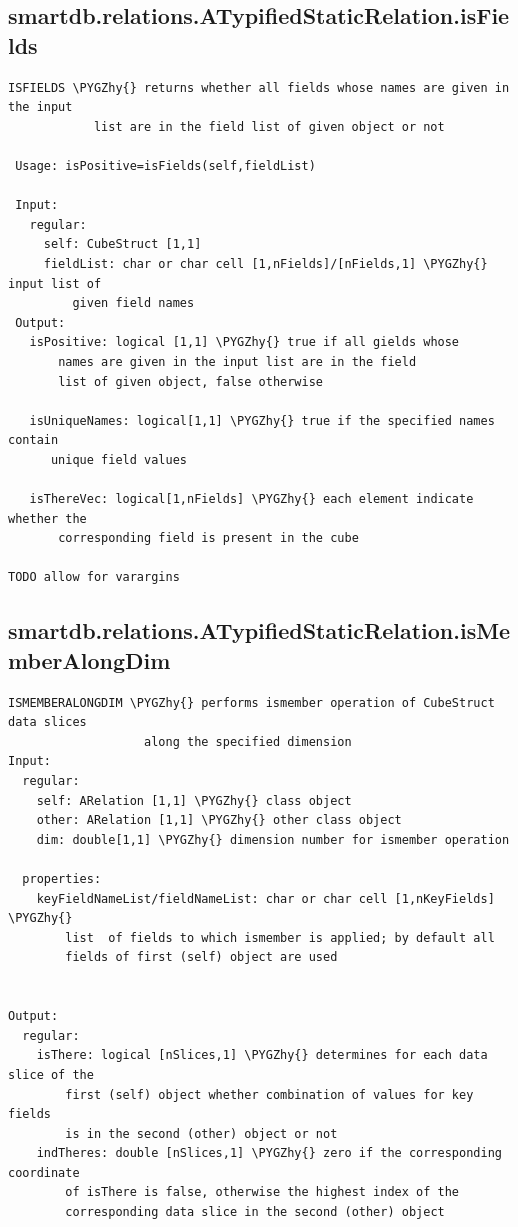 \documentclass[letterpaper,10pt,english]{sphinxmanual}
\def\PYGZhy{\char`\-}
\begin{document}
\subsection{smartdb.relations.ATypifiedStaticRelation.isFields}
\label{chap_functions:smartdb-relations-atypifiedstaticrelation-isfields}
\begin{Verbatim}[commandchars=\\\{\}]
 ISFIELDS \PYGZhy{} returns whether all fields whose names are given in the input
            list are in the field list of given object or not

 Usage: isPositive=isFields(self,fieldList)

 Input:
   regular:
     self: CubeStruct [1,1]
     fieldList: char or char cell [1,nFields]/[nFields,1] \PYGZhy{} input list of
         given field names
 Output:
   isPositive: logical [1,1] \PYGZhy{} true if all gields whose
       names are given in the input list are in the field
       list of given object, false otherwise

   isUniqueNames: logical[1,1] \PYGZhy{} true if the specified names contain
      unique field values

   isThereVec: logical[1,nFields] \PYGZhy{} each element indicate whether the
       corresponding field is present in the cube

TODO allow for varargins
\end{Verbatim}


\subsection{smartdb.relations.ATypifiedStaticRelation.isMemberAlongDim}
\label{chap_functions:smartdb-relations-atypifiedstaticrelation-ismemberalongdim}
\begin{Verbatim}[commandchars=\\\{\}]
ISMEMBERALONGDIM \PYGZhy{} performs ismember operation of CubeStruct data slices
                   along the specified dimension
Input:
  regular:
    self: ARelation [1,1] \PYGZhy{} class object
    other: ARelation [1,1] \PYGZhy{} other class object
    dim: double[1,1] \PYGZhy{} dimension number for ismember operation

  properties:
    keyFieldNameList/fieldNameList: char or char cell [1,nKeyFields] \PYGZhy{}
        list  of fields to which ismember is applied; by default all
        fields of first (self) object are used


Output:
  regular:
    isThere: logical [nSlices,1] \PYGZhy{} determines for each data slice of the
        first (self) object whether combination of values for key fields
        is in the second (other) object or not
    indTheres: double [nSlices,1] \PYGZhy{} zero if the corresponding coordinate
        of isThere is false, otherwise the highest index of the
        corresponding data slice in the second (other) object
\end{Verbatim}
\end{document}
